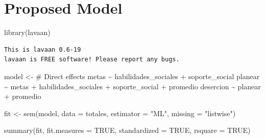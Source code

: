 \documentclass[
  letterpaper,
  DIV=11,
  numbers=noendperiod]{scrartcl}
\newenvironment{Shaded}{\begin{snugshade}}{\end{snugshade}}
\newcommand{\AttributeTok}[1]{\textcolor[rgb]{0.40,0.45,0.13}{#1}}
\newcommand{\ConstantTok}[1]{\textcolor[rgb]{0.56,0.35,0.01}{#1}}
\newcommand{\FunctionTok}[1]{\textcolor[rgb]{0.28,0.35,0.67}{#1}}
\newcommand{\NormalTok}[1]{\textcolor[rgb]{0.00,0.23,0.31}{#1}}
\newcommand{\OtherTok}[1]{\textcolor[rgb]{0.00,0.23,0.31}{#1}}
\newcommand{\StringTok}[1]{\textcolor[rgb]{0.13,0.47,0.30}{#1}}
\begin{document}
\section{Proposed Model}\label{proposed-model}

\begin{Shaded}
\begin{Highlighting}[]
\FunctionTok{library}\NormalTok{(lavaan)}
\end{Highlighting}
\end{Shaded}

\begin{verbatim}
This is lavaan 0.6-19
lavaan is FREE software! Please report any bugs.
\end{verbatim}

\begin{Shaded}
\begin{Highlighting}[]
\NormalTok{model }\OtherTok{\textless{}{-}} \StringTok{\textquotesingle{}}
\StringTok{  \# Direct effects}
\StringTok{  metas \textasciitilde{} habilidades\_sociales + soporte\_social}
\StringTok{  planear \textasciitilde{} metas + habilidades\_sociales + soporte\_social + promedio}
\StringTok{  desercion \textasciitilde{} planear + promedio}
\StringTok{\textquotesingle{}}

\NormalTok{fit }\OtherTok{\textless{}{-}} \FunctionTok{sem}\NormalTok{(model, }\AttributeTok{data =}\NormalTok{ totales, }\AttributeTok{estimator =} \StringTok{"ML"}\NormalTok{, }\AttributeTok{missing =} \StringTok{"listwise"}\NormalTok{)}

\FunctionTok{summary}\NormalTok{(fit, }\AttributeTok{fit.measures =} \ConstantTok{TRUE}\NormalTok{, }\AttributeTok{standardized =} \ConstantTok{TRUE}\NormalTok{, }\AttributeTok{rsquare =} \ConstantTok{TRUE}\NormalTok{)}
\end{Highlighting}
\end{Shaded}
\end{document}
